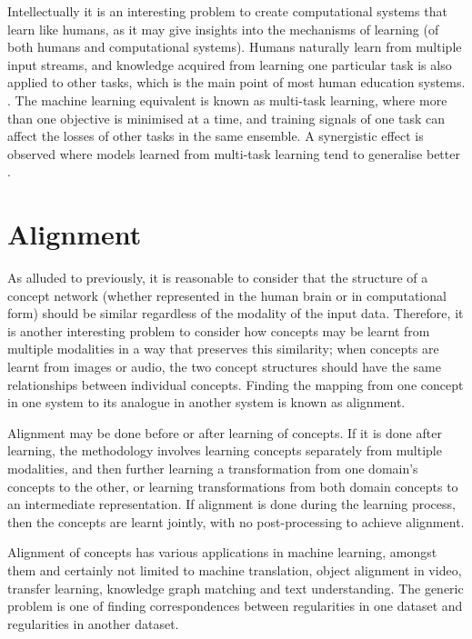 Intellectually it is an interesting problem to create computational systems that learn like humans, as it may give insights into the mechanisms of learning (of both humans and computational systems). Humans naturally learn from multiple input streams, and knowledge acquired from learning one particular task is also applied to other tasks, which is the main point of most human education systems. . The machine learning equivalent is known as multi-task learning, where more than one objective is minimised at a time, and training signals of one task can affect the losses of other tasks in the same ensemble. A synergistic effect is observed where models learned from multi-task learning tend to generalise better \cite{OverviewMultiTaskLearning}.

\section{Alignment}

As alluded to previously, it is reasonable to consider that the structure of a concept network (whether represented in the human brain or in computational form) should be similar regardless of the modality of the input data. Therefore, it is another interesting problem to consider how concepts may be learnt from multiple modalities in a way that preserves this similarity; when concepts are learnt from images or audio, the two concept structures should have the same relationships between individual concepts. Finding the mapping from one concept in one system to its analogue in another system is known as alignment. 

Alignment may be done before or after learning of concepts. If it is done after learning, the methodology involves learning concepts separately from multiple modalities, and then further learning a transformation from one domain's concepts to the other, or learning transformations from both domain concepts to an intermediate representation. If alignment is done during the learning process, then the concepts are learnt jointly, with no post-processing to achieve alignment. 

Alignment of concepts has various applications in machine learning, amongst them and certainly not limited to machine translation, object alignment in video, transfer learning, knowledge graph matching and text understanding.  The generic problem is one of finding correspondences between regularities in one dataset and regularities in another dataset. 

